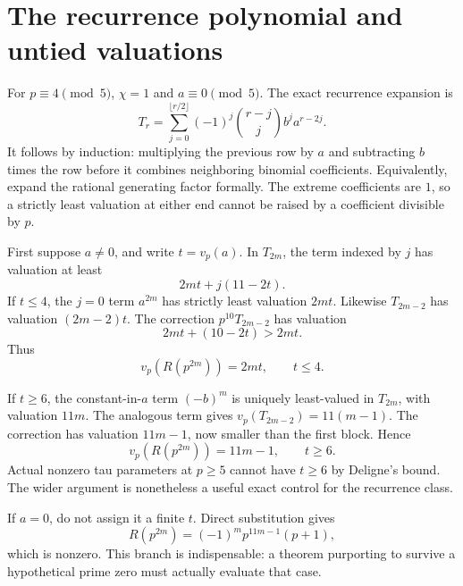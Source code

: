 \section{The recurrence polynomial and untied valuations}
For $p\equiv4\pmod5$, $\chi=1$ and $a\equiv0\pmod5$. The exact recurrence expansion is
\begin{equation}\label{eq:trexpansion}
T_r=\sum_{j=0}^{\lfloor r/2\rfloor}
(-1)^j\binom{r-j}{j}b^ja^{r-2j}.
\end{equation}
It follows by induction: multiplying the previous row by $a$ and subtracting $b$ times the row before it combines neighboring binomial coefficients. Equivalently, expand the rational generating factor formally. The extreme coefficients are $1$, so a strictly least valuation at either end cannot be raised by a coefficient divisible by $p$.

First suppose $a\ne0$, and write $t=v_p(a)$. In $T_{2m}$, the term indexed by $j$ has valuation at least
\[
2mt+j(11-2t).
\]
If $t\le4$, the $j=0$ term $a^{2m}$ has strictly least valuation $2mt$. Likewise $T_{2m-2}$ has valuation $(2m-2)t$. The correction $p^{10}T_{2m-2}$ has valuation
\[
2mt+(10-2t)>2mt.
\]
Thus
\begin{equation}\label{eq:eventlow}
v_p(R(p^{2m}))=2mt,\qquad t\le4.
\end{equation}

If $t\ge6$, the constant-in-$a$ term $(-b)^m$ is uniquely least-valued in $T_{2m}$, with valuation $11m$. The analogous term gives $v_p(T_{2m-2})=11(m-1)$. The correction has valuation $11m-1$, now smaller than the first block. Hence
\begin{equation}\label{eq:eventhigh}
v_p(R(p^{2m}))=11m-1,\qquad t\ge6.
\end{equation}
Actual nonzero tau parameters at $p\ge5$ cannot have $t\ge6$ by Deligne's bound. The wider argument is nonetheless a useful exact control for the recurrence class.

If $a=0$, do not assign it a finite $t$. Direct substitution gives
\begin{equation}\label{eq:evenzeroa}
R(p^{2m})=(-1)^mp^{11m-1}(p+1),
\end{equation}
which is nonzero. This branch is indispensable: a theorem purporting to survive a hypothetical prime zero must actually evaluate that case.

